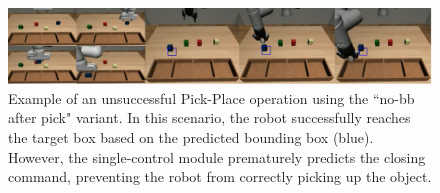 \begin{figure}[t]
    \centering
    \includegraphics[width=1.0\textwidth]{figures/images/ch3/error_no_bb_after_pick.jpg}
    \caption{Example of an unsuccessful Pick-Place operation using the  ``no-bb after pick" variant. In this scenario, the robot successfully reaches the target box based on the predicted bounding box (blue). However, the single-control module prematurely predicts the closing command, preventing the robot from correctly picking up the object.}
    \label{fig:error_no_bb_after_pick}
\end{figure}
